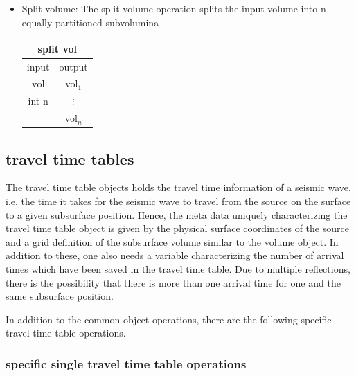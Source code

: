 \documentclass[12pt,a4paper]{article}
\newcommand{\bet}[1]{\begin{center}
		     \begin{tabular}{|c|c|}
		     \hline
		     \multicolumn{2}{|c|}{#1}\\
		     \hline\hline
		     input & output \\
                     \hline}
\newcommand{\eet}{\hline
		  \end{tabular}
		  \end{center}}
\begin{document}
\begin{itemize}
\item Split volume:
\newline
The split volume operation splits the input volume into n equally partitioned subvolumina
\bet{split vol}
$\mathrm{vol}$ & $\mathrm{vol}_1$\\
int n          & $\vdots$\\
               & $\mathrm{vol}_n$\\  
\eet
\end{itemize}


\subsection{travel time tables}

The travel time table objects holds the travel time
information of a seismic wave, i.e. the time it takes
for the seismic wave to travel from the source on the surface to 
a given subsurface position. Hence, the meta data uniquely
characterizing the travel time table object is given by
the physical surface coordinates of the source and a 
grid definition of the subsurface volume similar to the 
volume object. In addition to these, one also needs a variable characterizing 
the number of arrival times which have been saved in the travel time table. 
Due to multiple reflections, there is the possibility that there is more than one 
arrival time for one and the same subsurface position. 

In addition to the common object operations, there are the
following specific travel time table operations.  


\subsubsection{specific single travel time table operations}
\end{document}

